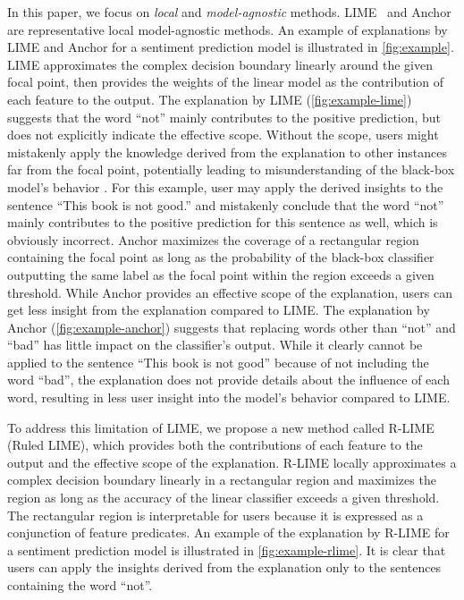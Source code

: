 \documentclass[11pt]{article}
\begin{document}
In this paper,
we focus on \emph{local} and \emph{model-agnostic} methods.
LIME~\cite{ribeiro2016why} and Anchor~\cite{ribeiro2018anchors}
are representative local model-agnostic methods.
An example of explanations by LIME and Anchor
for a sentiment prediction model is illustrated in \cref{fig:example}.
LIME approximates the complex decision boundary
linearly around the given focal point,
then provides the weights of the linear model as the contribution of each feature
to the output.
The explanation by LIME (\cref{fig:example-lime}) suggests that
the word ``not'' mainly contributes to the positive prediction,
but does not explicitly indicate the effective scope.
Without the scope,
users might mistakenly apply the knowledge derived from the explanation
to other instances far from the focal point,
potentially leading to misunderstanding of the black-box model's behavior
\cite{ribeiro2018anchors}.
For this example,
user may apply the derived insights
to the sentence ``This book is not good.''
and mistakenly conclude that the word ``not''
mainly contributes to the positive prediction for this sentence as well,
which is obviously incorrect.
Anchor maximizes the coverage of a rectangular region containing the focal point
as long as the probability of the black-box classifier outputting
the same label as the focal point within the region exceeds a given threshold.
While Anchor provides an effective scope of the explanation,
users can get less insight from the explanation compared to LIME\@.
The explanation by Anchor (\cref{fig:example-anchor})
suggests that replacing words other than ``not'' and ``bad''
has little impact on the classifier's output.
While it clearly cannot be applied to the sentence ``This book is not good''
because of not including the word ``bad'',
the explanation does not provide details about the influence of each word,
resulting in less user insight into the model's behavior compared to LIME.

To address this limitation of LIME,
we propose a new method called R-LIME (Ruled LIME),
which provides both the contributions of each feature to the output
and the effective scope of the explanation.
R-LIME locally approximates a complex decision boundary linearly
in a rectangular region and maximizes the region
as long as the accuracy of the linear classifier exceeds a given threshold.
The rectangular region is interpretable for users because it is
expressed as a conjunction of feature predicates.
An example of the explanation by R-LIME for a sentiment prediction model
is illustrated in \cref{fig:example-rlime}.
It is clear that users can apply the insights derived from the explanation
only to the sentences containing the word ``not''.
\end{document}
